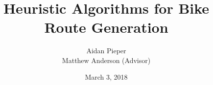 \documentclass{beamer}
\title[Bike Route Algorithms]{Heuristic Algorithms for Bike Route Generation}
\author{Aidan Pieper\\\footnotesize{Matthew Anderson (Advisor)}}
\institute{Computer Science Department, Union College}
\date{March 3, 2018}
\begin{document}
\begin{frame}
  \titlepage
\end{frame}


%
%
%
%
%
%
%
%
%
%
%
\end{document}
